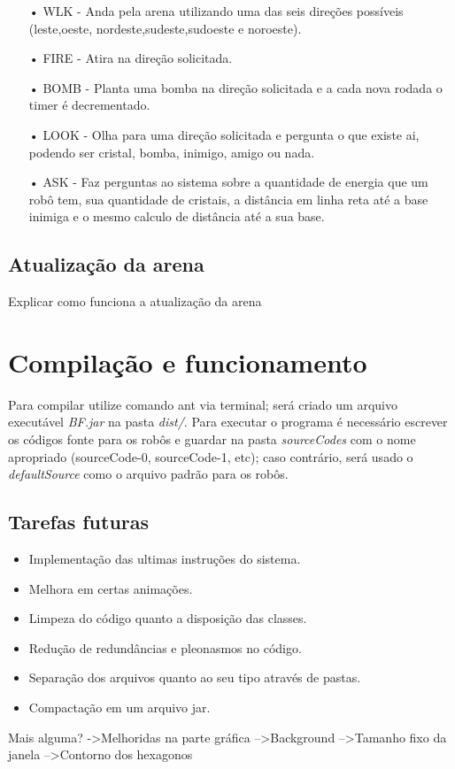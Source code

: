 \documentclass[a4paper]{article}
\begin{document}
\begin{itemize}
\item[•]{WLK - Anda pela arena utilizando uma das seis direções possíveis (leste,oeste, nordeste,sudeste,sudoeste e noroeste).}
\item[•]{FIRE - Atira na direção solicitada.}
\item[•]{BOMB - Planta uma bomba na direção solicitada e a cada nova rodada o timer é decrementado.}
\item[•]{LOOK - Olha para uma direção solicitada e pergunta o que existe ai, podendo ser cristal, bomba, inimigo, amigo ou nada.}
\item[•]{ASK - Faz perguntas ao sistema sobre a quantidade de energia que um robô tem, sua quantidade de cristais, a distância em linha reta até a base inimiga e o mesmo calculo de distância até a sua base.}
\end{itemize}
\subsection{Atualização da arena}
Explicar como funciona a atualização da arena

\section{Compilação e funcionamento}
Para compilar utilize comando ant via terminal; será criado um arquivo executável \textit{BF.jar} na pasta \textit{dist/}. Para executar o programa é necessário escrever os códigos fonte para os robôs e guardar na pasta \textit{sourceCodes} com o nome apropriado (sourceCode-0, sourceCode-1, etc); caso contrário, será usado o \textit{defaultSource} como o arquivo padrão para os robôs.

\subsection{Tarefas futuras}
\begin{itemize}
\item{Implementação das ultimas instruções do sistema.}
\item{Melhora em certas animações.}
\item{Limpeza do código quanto a disposição das classes.}
\item{Redução de redundâncias e pleonasmos no código.}
\item{Separação dos arquivos quanto ao seu tipo através de pastas.}
\item{Compactação em um arquivo jar.}
\end{itemize}

Mais alguma?
->Melhoridas na parte gráfica
	-->Background
	-->Tamanho fixo da janela
	-->Contorno dos hexagonos
\end{document}
